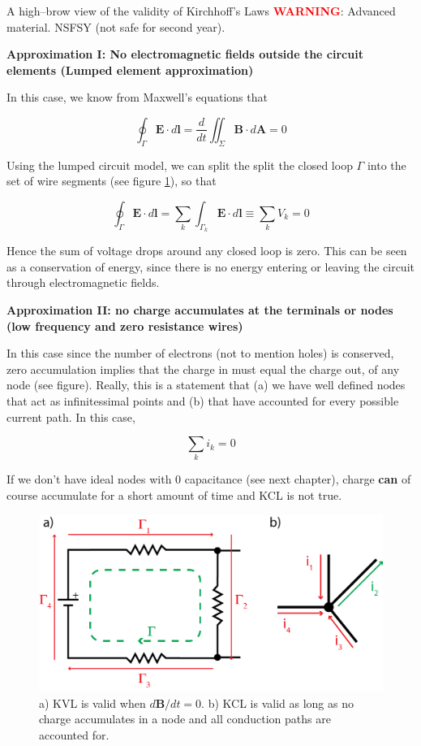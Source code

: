 \documentclass{tufte-book}
\begin{document}
\begin{myexample}[label = ex:when_kirchhoff_isvalid]{A high--brow view of the validity of Kirchhoff's Laws}
\textcolor{red}{\textbf{WARNING}}: Advanced material. NSFSY (not safe for second year).

\noindent\textbf{Approximation I: No electromagnetic fields outside the circuit elements (Lumped element approximation)}

In this case, we know from Maxwell's equations that

$$
\oint_\Gamma\textbf{E}\cdot d\textbf{l} = \frac{d}{dt}\iint_\Sigma\textbf{B}\cdot d\textbf{A} = 0
$$

Using the lumped circuit model, we can split the split the closed loop $\Gamma$ into the set of wire segments (see figure \ref{fig:when_kirchhoff_isvalid}), so that

$$
\oint_\Gamma\textbf{E}\cdot d\textbf{l} = \sum_k\int_{\Gamma_k}\textbf{E}\cdot d\textbf{l} \equiv \sum_kV_k = 0
$$

Hence the sum of voltage drops around any closed loop is zero. This can be seen as a conservation of energy, since there is no energy entering or leaving the circuit through electromagnetic fields.

\noindent\textbf{Approximation II: no charge accumulates at the terminals or nodes (low frequency and zero resistance wires)}

In this case since the number of electrons (not to mention holes) is conserved, zero accumulation implies that the charge in must equal the charge out, of any node (see figure). Really, this is a statement that (a) we have well defined nodes that act as infinitessimal points and (b) that have accounted for every possible current path. In this case,

$$
\sum_ki_k=0
$$

\noindent If we don't have ideal nodes with 0 capacitance (see next chapter), charge \textbf{can} of course accumulate for a short amount of time and KCL is not true.

\end{myexample}

\begin{figure}%
  \includegraphics[width=\linewidth]{kirchoff_highbrow}
  \caption{a) KVL is valid when $d\textbf{B}/dt = 0$. b) KCL is valid as long as no charge accumulates in a node and all conduction paths are accounted for.}
  \label{fig:when_kirchhoff_isvalid}
\end{figure}
\end{document}
